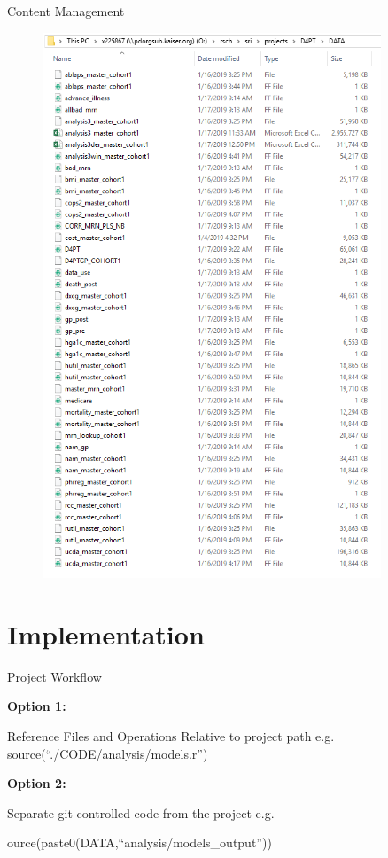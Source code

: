 \documentclass{beamer}
\begin{document}
\begin{frame}{Content Management}
\begin{minipage}{0.45\textwidth}
\begin{center}
\begin{figure}
\includegraphics[width=0.9\textwidth]{./shared_data.PNG}
\end{figure}
\end{center}
\end{minipage}

\end{frame}

\section*{Implementation}

\begin{frame}{Project Workflow}

\textbf{Option 1:}
\begin{center}
Reference Files and Operations Relative to project path e.g.\\
source(``./CODE/analysis/models.r'')
\end{center}
\bigskip

\textbf{Option 2:}
\begin{center}
Separate git controlled code from the project e.g.\\
\begin{small}
ource(paste0(DATA,``analysis/models\_output''))
\end{small}
\end{center}
\bigskip

\end{frame}
\end{document}
